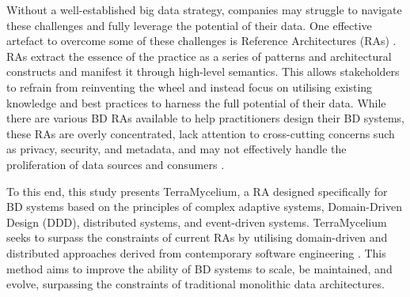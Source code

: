\documentclass[preprint,12pt]{elsarticle}
\begin{document}
Without a well-established big data strategy, companies may struggle to navigate these challenges and fully leverage the potential of their data. One effective artefact to overcome some of these challenges is Reference Architectures (RAs) \cite{Cloutier2010}. RAs extract the essence of the practice as a series of patterns and architectural constructs and manifest it through high-level semantics. This allows stakeholders to refrain from reinventing the wheel and instead focus on utilising existing knowledge and best practices to harness the full potential of their data. While there are various BD RAs available to help practitioners design their BD systems, these RAs are overly concentrated, lack attention to cross-cutting concerns such as privacy, security, and metadata, and may not effectively handle the proliferation of data sources and consumers \cite{ataei2022state,AtaeiACIS}.

To this end, this study presents TerraMycelium, a RA designed specifically for BD systems based on the principles of complex adaptive systems, Domain-Driven Design (DDD), distributed systems, and event-driven systems. TerraMycelium seeks to surpass the constraints of current RAs by utilising domain-driven and distributed approaches derived from contemporary software engineering \cite{ataei2023application}. This method aims to improve the ability of BD systems to scale, be maintained, and evolve, surpassing the constraints of traditional monolithic data architectures.

\end{document}
